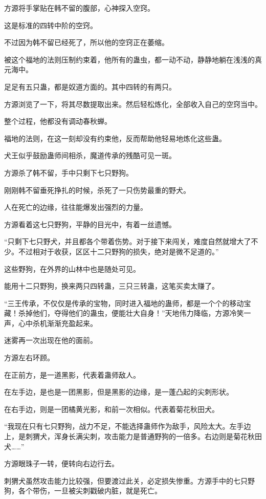 \begin{this_body}
方源将手掌贴在韩不留的腹部，心神探入空窍。

这是标准的四转中阶的空窍。

不过因为韩不留已经死了，所以他的空窍正在萎缩。

被这个福地的法则压制约束着，他所有的蛊虫，都一动不动，静静地躺在浅浅的真元海中。

足足有五只蛊，都是奴道方面的。其中四转的有两只。

方源浏览了一下，将其尽数提取出来。然后轻松炼化，全部收入自己的空窍当中。

整个过程，他都没有调动春秋蝉。

福地的法则，在这一刻却没有约束他，反而帮助他轻易地炼化这些蛊。

犬王似乎鼓励蛊师间相杀，魔道传承的残酷可见一斑。

方源杀了韩不留，手中只剩下七只野狗。

刚刚韩不留垂死挣扎的时候，杀死了一只伤势最重的野犬。

人在死亡的边缘，往往能爆发出强烈的力量。

方源看着这七只野狗，平静的目光中，有着一丝遗憾。

“只剩下七只野犬，并且都各个带着伤势。对于接下来闯关，难度自然就增大了不少。不过相对于收获，区区十二只野狗的损失，绝对是微不足道的。”

这些野狗，在外界的山林中也是随处可见。

能用十二只野狗，换来两只四转蛊，三只三转蛊，这笔买卖太赚了。

“三王传承，不仅仅是传承的宝物，同时进入福地的蛊师，都是一个个的移动宝藏！杀掉他们，夺得他们的蛊虫，便能壮大自身！”天地伟力降临，方源冷笑一声，心中杀机渐渐充盈起来。

迷雾再一次出现在他的面前。

方源左右环顾。

在正前方，是一道黑影，代表着蛊师敌人。

在左手边，是也是一团黑影，但是黑影的边缘，是一蓬凸起的尖刺形状。

在右手边，则是一团橘黄光影，和前一次相似。代表着菊花秋田犬。

“我现在只有七只野狗，战力不足，不能选择蛊师作为敌手，风险太大。左手边上，是刺猬犬，浑身长满尖刺，攻击能力是普通野狗的一倍多。右边则是菊花秋田犬……”

方源眼珠子一转，便转向右边行去。

刺猬犬虽然攻击能力比较强，但要渡过此关，必定损失惨重。方源手中的七只野狗，各个带伤，一旦被尖刺戳破内脏，就是死亡。


\end{this_body}
